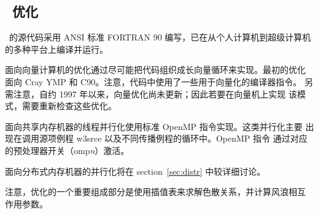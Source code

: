 
\vssub
\subsection{~优化} \label{sec:optim}
\vssub

\ws\ 的源代码采用 ANSI 标准 FORTRAN 90 编写，已在从个人计算机到超级计算机
的多种平台上编译并运行。

面向向量计算机的优化通过尽可能把代码组织成长向量循环来实现。最初的优化
面向 Cray YMP 和 C90。注意，代码中使用了一些用于向量化的编译器指令。
另需注意，自约 1997 年以来，向量优化尚未更新；因此若要在向量机上实现
该模式，需要重新检查这些优化。

面向共享内存机器的线程并行化使用标准 OpenMP 指令实现。这类并行化主要
出现在调用源项例程 {\F w3srce} 以及不同传播例程的循环中。OpenMP 指令
通过对应的预处理器开关（{\F omp}{\it n}）激活。

面向分布式内存机器的并行化将在 section~\ref{sec:distr} 中较详细讨论。

注意，优化的一个重要组成部分是使用插值表来求解色散关系，并计算风浪相互
作用参数。
